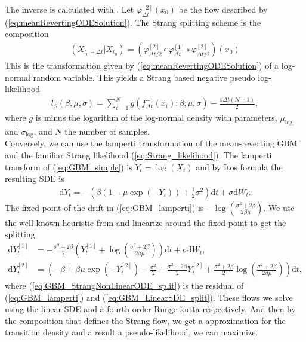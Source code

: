 The inverse is calculated with \cite[remark belown equation (9)]{SplittingSchemes}. Let $\varphi_{\Delta t}^{[2]}(x_0)$ be the flow described by (\ref{eq:meanRevertingODESolution}).
The Strang splitting scheme is the composition
\begin{align}
    \left(X_{t_0 + \Delta t} | X_{t_0}\right) = \left(\varphi_{\Delta t / 2}^{[2]}\circ \varphi_{\Delta t}^{[1]} \circ \varphi_{\Delta t / 2}^{[2]}\right)(x_0)
\end{align}
This is the transformation given by (\ref{eq:meanRevertingODESolution}) of a log-normal random variable. This yields a Strang based negative pseudo log-likelihood
\begin{align}
    l_S(\beta, \mu, \sigma) = \sum_{i = 1}^{N} g(f_{\Delta t}^{-1}(x_i); \beta,\mu, \sigma) - \frac{\beta\Delta t(N - 1)}{2},
\end{align}
where $g$ is minus the logarithm of the log-normal density with parameters, $\mu_{\mathrm{log}}$ and $\sigma_{\mathrm{log}}$, and $N$ the number of samples.\\
Conversely, we can use the lamperti transformation of the mean-reverting GBM and the familiar Strang likelihood (\ref{eq:Strang_likelihood}). The lamperti transform of (\ref{eq:GBM_simple}) is $Y_t = \log(X_t)$ and by Itos formula the resulting SDE is
\begin{align}
    \mathrm{d}Y_t = -\left(\beta\left(1 - \mu\exp(-Y_t)\right) + \frac{1}{2}\sigma^2\right)\mathrm{d}t + \sigma \mathrm{d}W_t. \label{eq:GBM_lamperti}
\end{align}
The fixed point of the drift in (\ref{eq:GBM_lamperti}) is $-\log\left(\frac{\sigma^2 + 2\beta}{2\beta\mu}\right)$. We use the well-known heuristic from \cite{SplittingSchemes} and linearize around the fixed-point to get the splitting
\begin{align}
    \mathrm{d}Y_t^{[1]} &= - \frac{\sigma^2 + 2\beta}{2}\left(Y_t^{[1]} + \log\left(\frac{\sigma^2 + 2\beta}{2\beta \mu}\right)\right)\mathrm{d}t + \sigma \mathrm{d}W_t, \label{eq:GBM_LinearSDE_split}\\
    \mathrm{d}Y_t^{[2]} &= \left(-\beta + \beta\mu\exp(-Y_t^{[2]}) - \frac{\sigma^2}{2} + \frac{\sigma^2+2\beta}{2}Y_t^{[2]} + \frac{\sigma^2+2\beta}{2}\log\left(\frac{\sigma^2+2\beta}{2\beta\mu}\right)\right)\mathrm{d}t, \label{eq:GBM_StrangNonLinearODE_split}
\end{align}
where (\ref{eq:GBM_StrangNonLinearODE_split}) is the residual of (\ref{eq:GBM_lamperti}) and (\ref{eq:GBM_LinearSDE_split}).
These flows we solve using the linear SDE and a fourth order Runge-kutta respectively. And then by the composition that defines the Strang flow, we get a approximation for the transition density and a result a pseudo-likelihood, we can maximize.

